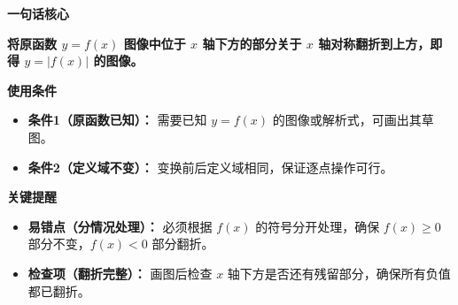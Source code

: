 \begin{summarybox}
	\textbf{\textcolor{CSummary}{一句话核心}}

	\textbf{将原函数 $y=f(x)$ 图像中位于 $x$ 轴下方的部分关于 $x$ 轴对称翻折到上方，即得 $y=|f(x)|$ 的图像。}

	\medskip
	\textbf{\textcolor{CSummary}{使用条件}}
	\begin{itemize}[leftmargin=*, itemsep=0.5em, topsep=0.4em]
		\item \textbf{条件1（原函数已知）：} 需要已知 $y=f(x)$ 的图像或解析式，可画出其草图。
		\item \textbf{条件2（定义域不变）：} 变换前后定义域相同，保证逐点操作可行。
	\end{itemize}

	\medskip
	\textbf{\textcolor{CSummary}{关键提醒}}
	\begin{itemize}[leftmargin=*, itemsep=0.5em, topsep=0.4em]
		\item \textbf{易错点（分情况处理）：} 必须根据 $f(x)$ 的符号分开处理，确保 $f(x)\ge0$ 部分不变，$f(x)<0$ 部分翻折。
		\item \textbf{检查项（翻折完整）：} 画图后检查 $x$ 轴下方是否还有残留部分，确保所有负值都已翻折。
	\end{itemize}
\end{summarybox}
